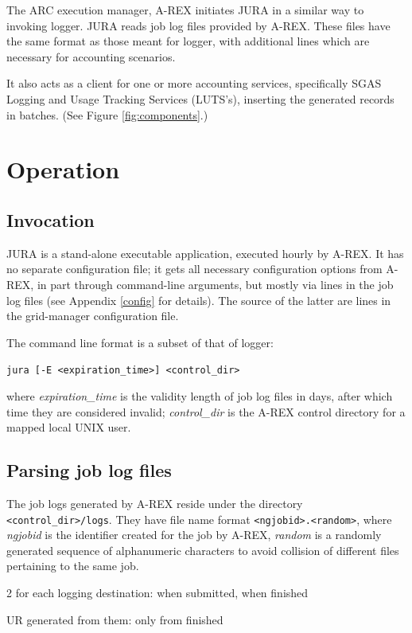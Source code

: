 \documentclass{article}                            %
\begin{document}
The ARC execution manager, A-REX\cite{arex} initiates JURA in a
similar way to invoking logger. JURA reads job log files provided by
A-REX. These files have the same format as those meant for logger,
with additional lines which are necessary for accounting scenarios.

It also acts as a client for one or more accounting services,
specifically SGAS Logging and Usage Tracking Services (LUTS's),
inserting the generated records in batches. (See Figure
\ref{fig:components}.)

\section{Operation}

\subsection{Invocation}

JURA is a stand-alone executable application, executed hourly by
A-REX. It has no separate configuration file; it gets all necessary
configuration options from A-REX, in part through command-line
arguments, but mostly via lines in the job log files (see Appendix
\ref{config} for details). The source of the latter are lines in the
grid-manager configuration file.

The command line format is a subset of that of logger:

\verb|jura [-E <expiration_time>] <control_dir>|

where \textit{expiration\_time} is the validity length of job log
files in days, after which time they are considered invalid;
\textit{control\_dir} is the A-REX control directory for a mapped
local UNIX user.

\subsection{Parsing job log files}
\label{joblogs}
The job logs generated by A-REX reside under the directory
\verb|<control_dir>/logs|. They have file name format
\verb|<ngjobid>.<random>|, where \textit{ngjobid} is the identifier
created for the job by A-REX, \textit{random} is a randomly generated
sequence of alphanumeric characters to avoid collision of different
files pertaining to the same job.

2 for each logging destination: when submitted, when finished

UR generated from them: only from finished
\end{document}
